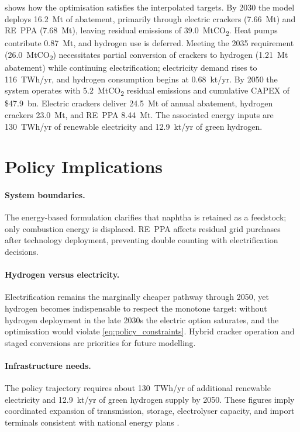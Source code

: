 \documentclass[12pt,a4paper]{article}
\begin{document}
 shows how the optimisation satisfies the interpolated targets. By 2030 the model deploys 16.2~Mt of abatement, primarily through electric crackers (7.66~Mt) and RE~PPA (7.68~Mt), leaving residual emissions of 39.0~MtCO\textsubscript{2}. Heat pumps contribute 0.87~Mt, and hydrogen use is deferred. Meeting the 2035 requirement (26.0~MtCO\textsubscript{2}) necessitates partial conversion of crackers to hydrogen (1.21~Mt abatement) while continuing electrification; electricity demand rises to 116~TWh/yr, and hydrogen consumption begins at 0.68~kt/yr. By 2050 the system operates with 5.2~MtCO\textsubscript{2} residual emissions and cumulative CAPEX of \$47.9~bn. Electric crackers deliver 24.5~Mt of annual abatement, hydrogen crackers 23.0~Mt, and RE~PPA 8.44~Mt. The associated energy inputs are 130~TWh/yr of renewable electricity and 12.9~kt/yr of green hydrogen.

\section{Policy Implications}
\label{sec:policy}

\paragraph{System boundaries.} The energy-based formulation clarifies that naphtha is retained as a feedstock; only combustion energy is displaced. RE~PPA affects residual grid purchases after technology deployment, preventing double counting with electrification decisions.

\paragraph{Hydrogen versus electricity.} Electrification remains the marginally cheaper pathway through 2050, yet hydrogen becomes indispensable to respect the monotone target: without hydrogen deployment in the late 2030s the electric option saturates, and the optimisation would violate \eqref{eq:policy_constraints}. Hybrid cracker operation and staged conversions are priorities for future modelling.

\paragraph{Infrastructure needs.} The policy trajectory requires about 130~TWh/yr of additional renewable electricity and 12.9~kt/yr of green hydrogen supply by 2050. These figures imply coordinated expansion of transmission, storage, electrolyser capacity, and import terminals consistent with national energy plans \citep{Korea10thPlan,HydrogenCouncil2021}.
\end{document}
